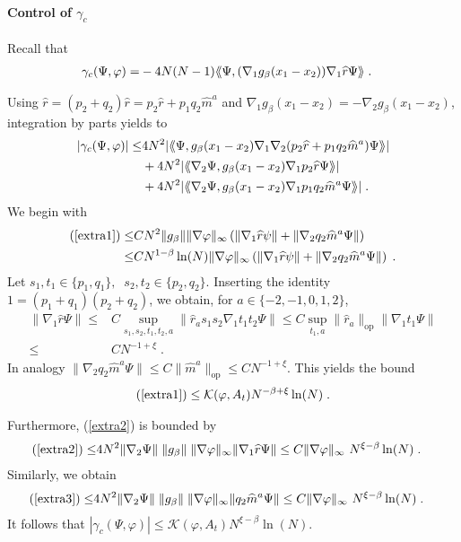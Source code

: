 \documentclass[11pt, english, american]{article}
\newcommand{\laa}{\langle\hspace{-0.08cm}\langle}
\newcommand{\raa}{\rangle\hspace{-0.08cm}\rangle}
\renewcommand{\phi}{\varphi}
\newcommand{\bs}{\gamma_c}
\begin{document}
\paragraph{Control of $\bs$}
Recall that \begin{align*} \bs (\Psi,\phi)=&-4N(N-1)\laa\Psi
, (\nabla_1g_{\beta}(x_1-x_2))\nabla_1
\widehat{r}\Psi\raa\;.\end{align*}

Using $\widehat{r}=(p_2+q_2)\widehat{r}=p_2\widehat{r}+p_1q_2\widehat{m}^a$  and $\nabla_1g_{\beta}(x_1-x_2)=-\nabla_2g_{\beta}(x_1-x_2)$, integration  by parts yields to
\begin{align}\label{extra1} 
|\bs (\Psi,\phi)|\leq&
4N^2|\laa\Psi
, g_{\beta}(x_1-x_2)\nabla_1\nabla_2
(
p_2\widehat{r}+p_1q_2\widehat{m}^a
)
\Psi\raa|
%
\\\label{extra2}&+
4N^2|\laa\nabla_2\Psi
, g_{\beta}(x_1-x_2)\nabla_1
p_2\widehat{r}\Psi\raa|
%
\\\label{extra3}&+4N^2|\laa\nabla_2\Psi
, g_{\beta}(x_1-x_2)\nabla_1
p_1q_2\widehat{m}^a\Psi\raa|
\;.\end{align}
We begin with 
\begin{align*}
(\ref{extra1})\leq &C N^2
\|g_\beta\| 
 \| \nabla \varphi \|_\infty
\left(
 \| \nabla_1 \widehat{r} \psi \|
 +
 \| \nabla_ 2 q_2 \widehat{m}^a\Psi \|
 \right)
 \\
 \leq &
 C
 N^{1-\beta} \ln(N)
  \| \nabla \varphi \|_\infty 
  \left(
\| \nabla_1 \widehat{r} \psi \|
 +
 \| \nabla_ 2 q_2 \widehat{m}^a\Psi \|
 \right)
 \;.
\end{align*}
Let $s_1,t_1\in \lbrace p_1,q_1 \rbrace , \; \;
s_2,t_2\in \lbrace p_2,q_2 \rbrace$. Inserting the identity $1=(p_1+q_1)(p_2+q_2)$, we obtain,
for $a \in \lbrace -2,-1,0,1,2 \rbrace$, 
\begin{align*}
\|\nabla_1\widehat{r}\Psi\|
\leq& C
\sup_{s_1,s_2,t_1,t_2, a}
 \|\widehat{r}_a s_1 s_2 \nabla_1 t_1 t_2 \Psi \|
\leq C
\sup_{t_1, a}
 \|\widehat{r}_a\|_{\text{op}} \|\nabla_1 t_1 \Psi \|
 \\
 \leq &
 C N^{-1 + \xi}
 \;.
\end{align*}
In analogy $ \| \nabla_ 2 q_2 \widehat{m}^a\Psi \| \leq C \| \widehat{m}^a \|_{\text{op}} \leq C N^{-1 + \xi}$.
This yields the bound
\begin{align*}
(\ref{extra1})\leq
\mathcal{K}(\phi, A_t)
N^{-\beta+ \xi} \ln( N)
\;.
\end{align*}



Furthermore,  (\ref{extra2}) is bounded by
\begin{align}
(\ref{extra2})\leq&4N^2\|\nabla_2\Psi\|\;
\|g_{\beta}\|\;\| \nabla \phi\|_\infty\|\nabla_1\widehat{r}\Psi\|
%
\leq C
\|\nabla \phi\|_\infty\
 N^{\xi-\beta} \ln(N) \;.
\end{align}
Similarly, we obtain
\begin{align*}(\ref{extra3})\leq&
4N^2\|\nabla_2\Psi\|\;
\|g_{\beta}\|\;\|\nabla \phi\|_\infty\| q_2 \widehat{m}^a  \Psi\|
%
\leq C \| \nabla \phi\|_\infty\  N^{ \xi-\beta} \ln(N) \;.
\end{align*}
It follows that $ |\bs (\Psi,\phi)|\leq 
\mathcal{K}(\phi, A_t)
	 N^{  \xi-\beta} 
 	\ln(N)
$. 
\end{document}
